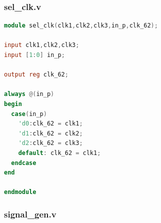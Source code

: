 \documentclass[11pt]{scrartcl}
\begin{document}
\subsubsection{sel\_clk.v}
\begin{lstlisting}[language=Verilog]
module sel_clk(clk1,clk2,clk3,in_p,clk_62);

input clk1,clk2,clk3;
input [1:0] in_p;

output reg clk_62;

always @(in_p)
begin
  case(in_p)
    'd0:clk_62 = clk1;
    'd1:clk_62 = clk2;
    'd2:clk_62 = clk3;
    default: clk_62 = clk1;
  endcase
end

endmodule
\end{lstlisting}

\subsubsection{signal\_gen.v}
\end{document}
